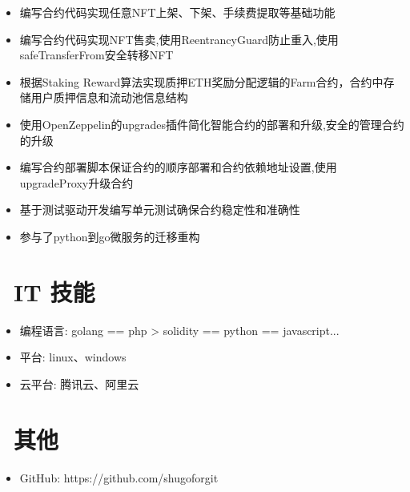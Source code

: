 \documentclass{resume}
\begin{document}
\begin{itemize}
  \item 编写合约代码实现任意NFT上架、下架、手续费提取等基础功能
  \item 编写合约代码实现NFT售卖,使用ReentrancyGuard防止重入,使用safeTransferFrom安全转移NFT
  \item 根据Staking Reward算法实现质押ETH奖励分配逻辑的Farm合约，合约中存储用户质押信息和流动池信息结构
  \item 使用OpenZeppelin的upgrades插件简化智能合约的部署和升级,安全的管理合约的升级
  \item 编写合约部署脚本保证合约的顺序部署和合约依赖地址设置,使用upgradeProxy升级合约
  \item 基于测试驱动开发编写单元测试确保合约稳定性和准确性
  \item 参与了python到go微服务的迁移重构
\end{itemize}



\section{\faCogs\ IT 技能}
\begin{itemize}[parsep=0.5ex]
  \item 编程语言: golang == php > solidity == python == javascript... 
  \item 平台: linux、windows
  \item 云平台: 腾讯云、阿里云
\end{itemize}

\section{\faInfo\ 其他}
\begin{itemize}[parsep=0.5ex]
  \item GitHub: https://github.com/shugoforgit
\end{itemize}

%
%
\end{document}
